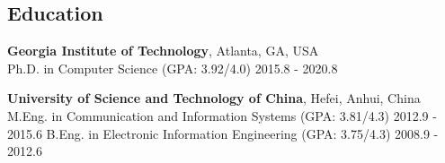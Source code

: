 \documentclass[line,11pt,letter]{includes/cls/myRes}
\begin{document}


\address{779 Cascade Dr, CA 94087, United States}
\address{Cell: +1(404)697-0608. \hspace{5pt} Email: lgong2020@yahoo.com}

\begin{resume}



\vspace*{-10pt}
\vspace*{-15pt}
\section{Education}
\vspace{-4pt}
{\setlength{\parskip}{0pt}
\textbf{Georgia Institute of Technology}, Atlanta, GA, USA\\
{\hspace*{1em} Ph.D. in Computer Science (GPA: 3.92/4.0) \hspace{52.5pt} \hfill 2015.8 - 2020.8 \break}
}
\sspace

{\setlength{\parskip}{0pt}
\textbf{University of Science and Technology of China}, Hefei, Anhui, China\\
{\hspace*{1em} M.Eng. in Communication and Information Systems (GPA: 3.81/4.3) \hspace{52.5pt} \hfill 2012.9 - 2015.6\break}
{\hspace*{1em} B.Eng. in Electronic Information Engineering (GPA: 3.75/4.3) \hspace{52.5pt} \hfill 2008.9 - 2012.6\break}
}
\negspace

\end{resume}
\end{document}
